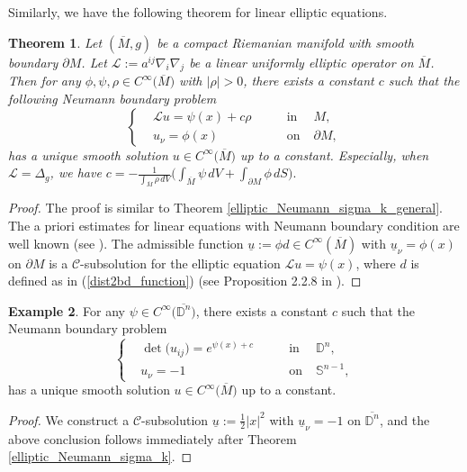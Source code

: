 \documentclass[12pt]{amsart}
\newtheorem{theorem}{Theorem}[section]
\theoremstyle{definition}
\newtheorem{example}[theorem]{Example}
\theoremstyle{remark}
\numberwithin{equation}{section}
\begin{document}
Similarly, we have the following theorem for linear elliptic equations.
\begin{theorem}
	Let $(\overline{M}, g)$ be a compact Riemanian manifold with smooth boundary $\partial M$.
	Let $\mathcal{L} := a^{ij}\nabla_i \nabla_j$ be a linear uniformly elliptic operator on $\overline{M}$. 
	Then for any $\phi, \psi, \rho \in C^{\infty}\big( \overline{M} \big)$ with $|\rho| > 0$, there exists a constant $c$ such that the following Neumann boundary problem
	\begin{equation}\label{eq_linear_elliptic_2}
	\left\{
	\begin{aligned}
	&\mathcal{L} u = \psi(x) + c \rho \qquad &\text{in}&\; M, \\ 
	&u_\nu = \phi(x) \qquad &\text{on}& \; \partial M,   
	\end{aligned}
	\right.
	\end{equation}
	has a unique smooth solution $u \in C^{\infty} \big(\overline{M} \big)$ up to a constant. Especially, when $\mathcal{L} = \Delta_g$, we have $c = - \frac{1}{\int_{\overline{M}} \rho \,dV} \Big( \int_{\overline{M}} \psi \,dV + \int_{\partial M} \phi \,dS \Big).$
\end{theorem}
\begin{proof}
	The proof is similar to Theorem \ref{elliptic_Neumann_sigma_k_general}.
	The a priori estimates for linear equations with Neumann boundary condition are well known (see \cite{LSU68}).
	The admissible function $\underline{u} := \phi d \in C^{\infty}(\overline{M})$ with $\underline{u}_{\nu} = \phi(x)$ on $\partial M$ is a $\mathcal{C}$-subsolution for the elliptic equation $\mathcal{L} u = \psi(x)$, where $d$ is defined as in (\ref{dist2bd_function}) (see Proposition 2.2.8 in \cite{GuoThesis19}). 
\end{proof}


\begin{example}
	For any $\psi \in C^{\infty}\big( \overline{\mathbb{D}^{n}} \big)$, there exists a constant $c$ such that the Neumann boundary problem
	\begin{equation}
	\left\{
	\begin{aligned}
	&\det\big(u_{ij}\big) = e^{\psi(x) + c} \qquad &\text{in}&\; \mathbb{D}^{n}, \\ 
	&u_\nu = -1 \qquad &\text{on}& \; \mathbb{S}^{n-1},   
	\end{aligned}
	\right.
	\end{equation}
	has a unique smooth solution $u \in C^{\infty} \big(\overline{M} \big)$ up to a constant.
\end{example}
\begin{proof}
	We construct a $\mathcal{C}$-subsolution $\underline{u} := \frac{1}{2} |x|^2$ with $\underline{u}_\nu = -1$ on $\overline{\mathbb{D}^{n}}$, and the above conclusion follows immediately after Theorem \ref{elliptic_Neumann_sigma_k}. 
\end{proof}
\end{document}
